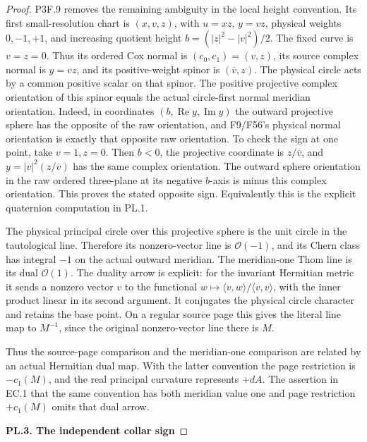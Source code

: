 \begin{proof}
P3F.9 removes the remaining ambiguity in the local height convention.
Its first small-resolution chart is \((x,v,z)\), with
\(u=xz\), \(y=vz\), physical weights \(0,-1,+1\), and increasing
quotient height \(b=(|z|^2-|v|^2)/2\). The fixed curve is
\(v=z=0\). Thus its ordered Cox normal is \((c_0,c_1)=(v,z)\), its
source complex normal is \(y=vz\), and its positive-weight spinor is
\((\overline v,z)\). The physical circle acts by a common positive
scalar on that spinor. The positive projective complex orientation of
this spinor equals the actual circle-first normal meridian orientation.
Indeed, in coordinates \((b,\operatorname{Re}y,\operatorname{Im}y)\)
the outward projective sphere has the opposite of the raw orientation,
and F9/F56's physical normal orientation is exactly that opposite raw
orientation. To check the sign at one point, take \(v=1,z=0\). Then
\(b<0\), the projective coordinate is \(z/\overline v\), and
\(y=|v|^2(z/\overline v)\) has the same complex orientation. The
outward sphere orientation in the raw ordered three-plane at its
negative \(b\)-axis is minus this complex orientation. This proves the
stated opposite sign. Equivalently this is the explicit quaternion computation
in PL.1.

The physical principal circle over this projective sphere is the unit
circle in the tautological line. Therefore its nonzero-vector line is
\(\mathcal O(-1)\), and its Chern class has integral \(-1\) on the
actual outward meridian. The meridian-one Thom line is its dual
\(\mathcal O(1)\). The duality arrow is explicit: for the invariant
Hermitian metric it sends a nonzero vector \(v\) to the functional
\(w\mapsto\langle v,w\rangle/\langle v,v\rangle\), with the inner
product linear in its second argument. It conjugates the physical
circle character and retains the base point. On a regular source page
this gives the literal line map to \(M^{-1}\), since the original
nonzero-vector line there is \(M\).

Thus the source-page comparison and the meridian-one comparison are
related by an actual Hermitian dual map. With the latter convention the
page restriction is \(-c_1(M)\), and the real principal curvature
represents \(+dA\). The assertion in EC.1 that the same convention has
both meridian value one and page restriction \(+c_1(M)\) omits that
dual arrow.

\par

\medskip\noindent\textbf{PL.3. The independent collar sign}

\par\nopagebreak[4]


\end{proof}
